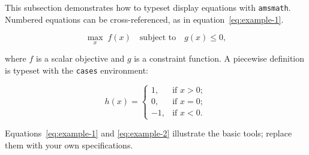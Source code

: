 
This subsection demonstrates how to typeset display equations with
\texttt{amsmath}. Numbered equations can be cross-referenced, as in
equation~\eqref{eq:example-1}.

\begin{equation}
\max_{x} \; f(x) \quad \text{subject to} \quad g(x) \leq 0,
\label{eq:example-1}
\end{equation}

where $f$ is a scalar objective and $g$ is a constraint function. A
piecewise definition is typeset with the \texttt{cases} environment:

\begin{equation}
h(x) =
\begin{cases}
1, & \text{if } x > 0;\\
0, & \text{if } x = 0;\\
-1, & \text{if } x < 0.
\end{cases}
\label{eq:example-2}
\end{equation}

Equations~\eqref{eq:example-1} and \eqref{eq:example-2} illustrate the
basic tools; replace them with your own specifications.
